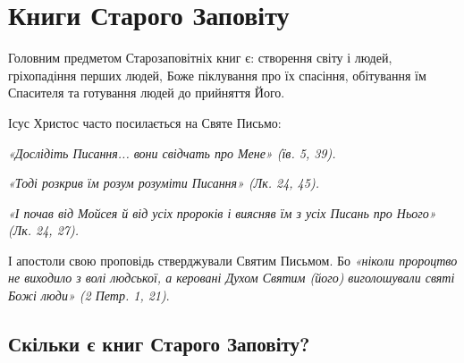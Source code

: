 \documentclass[main.tex]{subfiles}
\begin{document}
\section{Книги Старого Заповіту}

Головним предметом Старозаповітніх книг є: створення світу і людей, гріхопадіння перших людей, Боже піклування про їх спасіння, обітування їм Спасителя та готування людей до прийняття Його.

Ісус Христос часто посилається на Святе Письмо:

\begin{FlushRight}
    \emph{{\color{red} «Дослідіть Писання... вони свідчать про Мене»} (їв. 5, 39).}
\end{FlushRight}
\begin{FlushRight}
    \emph{«Тоді розкрив їм розум розуміти Писання» (Лк. 24, 45).}
\end{FlushRight}
\begin{FlushRight}
    \emph{«І почав від Мойсея й від усіх пророків і виясняв їм з усіх Писань про Нього» (Лк. 24, 27).}
\end{FlushRight}

І апостоли свою проповідь стверджували Святим Письмом. Бо \emph{«ніколи пророцтво не виходило з волі людської, а керовані Духом Святим (його) виголошували святі Божі люди» (2 Петр. 1, 21)}.

\subsection{Скільки є книг Старого Заповіту?}
\end{document}
